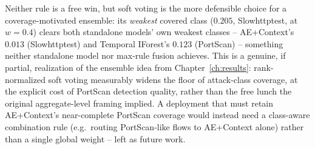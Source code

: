 Neither rule is a free win, but soft voting is the more defensible choice for a coverage-motivated ensemble: its \emph{weakest} covered class ($0.205$, Slowhttptest, at $w=0.4$) clears both standalone models' own weakest classes -- AE+Context's $0.013$ (Slowhttptest) and Temporal IForest's $0.123$ (PortScan) -- something neither standalone model nor max-rule fusion achieves. This is a genuine, if partial, realization of the ensemble idea from Chapter~\ref{ch:results}: rank-normalized soft voting measurably widens the floor of attack-class coverage, at the explicit cost of PortScan detection quality, rather than the free lunch the original aggregate-level framing implied. A deployment that must retain AE+Context's near-complete PortScan coverage would instead need a class-aware combination rule (e.g.\ routing PortScan-like flows to AE+Context alone) rather than a single global weight -- left as future work.

